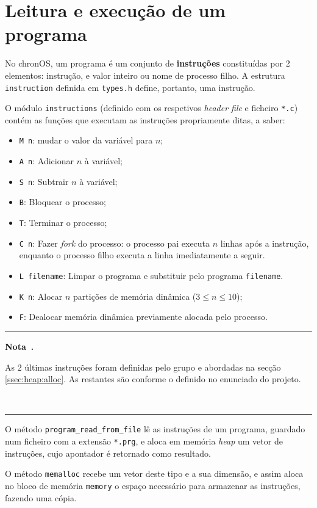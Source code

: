 \documentclass[10pt,oneside]{estiloUBI}
\newcommand{\chronOS}{\textsf{chronOS}}
\newcounter{note}
\newenvironment{note}[1][]
	{
		\medskip \refstepcounter{note} \par \medskip
		\noindent\textcolor[RGB]{220,220,220}{\rule{\linewidth}{0.4pt}}
		\noindent \textbf{Nota~\thenote. #1} \rmfamily
	}
	{
		\\ \noindent\textcolor[RGB]{220,220,220}{\rule{\linewidth}{0.4pt}} \medskip
	}
\begin{document}
	
	\chapter{Leitura e execução de um programa}
	\label{sec:program}
	
	No \chronOS, um programa é um conjunto de \textbf{instruções} constituídas por 2 elementos: instrução, e valor inteiro ou nome de processo filho. A estrutura \verb|instruction| definida em \verb|types.h| define, portanto, uma instrução.
	
	O módulo \texttt{instructions} (definido com os respetivos \textit{header file} e ficheiro \verb|*.c|) contém as funções que executam as instruções propriamente ditas, a saber:
	
	\begin{itemize}
		\item \verb|M n|: mudar o valor da variável para $n$;
		\item \verb|A n|: Adicionar $n$ à variável;
		\item \verb|S n|: Subtrair $n$ à variável;
		\item \verb|B|: Bloquear o processo;
		\item \verb|T|: Terminar o processo;
		\item \verb|C n|: Fazer \textit{fork} do processo: o processo pai executa $n$ linhas após a instrução, enquanto o processo filho executa a linha imediatamente a seguir.
		\item \verb|L filename|: Limpar o programa e substituir pelo programa \verb|filename|.
		\item \verb|K n|: Alocar $n$ partições de memória dinâmica ($3 \leq n \leq 10$);
		\item \verb|F|: Dealocar memória dinâmica previamente alocada pelo processo.
	\end{itemize}

	\begin{note}
		As 2 últimas instruções foram definidas pelo grupo e abordadas na secção \ref{ssec:heap:alloc}. As restantes são conforme o definido no enunciado do projeto.
	\end{note}
	
	O método \verb|program_read_from_file| lê as instruções de um programa, guardado num ficheiro com a extensão \verb|*.prg|, e aloca em memória \textit{heap} um vetor de instruções, cujo apontador é retornado como resultado.
	
	O método \verb|memalloc| recebe um vetor deste tipo e a sua dimensão, e assim aloca no bloco de memória \verb|memory| o espaço necessário para armazenar as instruções, fazendo uma cópia.
	
\end{document}
